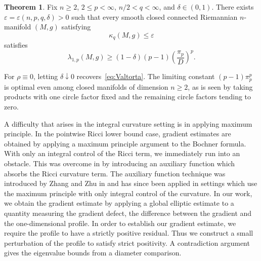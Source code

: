 \documentclass[11pt]{amsart}
\theoremstyle{definition}
\newtheorem{theorem}{Theorem}[section]
\newtheorem{lemma}[theorem]{Lemma}
\begin{document}
\begin{theorem}\label{thm:main}
Fix $n\ge2$, $2\le p<\infty$, $n/2<q<\infty$, and $\delta\in(0,1)$. There exists $\varepsilon=\varepsilon(n,p,q,\delta)>0$ such that every smooth closed connected Riemannian $n$-manifold $(M,g)$ satisfying
\[
 \kappa_q(M,g)\le\varepsilon
\]
satisfies
\begin{equation}\label{eq:main}
 \lambda_{1,p}(M,g)\ge(1-\delta)(p-1)
                  \left(\frac{\pi_p}{D}\right)^p.
\end{equation}
\end{theorem}
 For $\rho\equiv0$, letting $\delta\downarrow0$ recovers~\eqref{eq:Valtorta}. The limiting constant $(p-1)\pi_p^p$ is optimal even among closed manifolds of dimension $n\ge2$, as is seen by taking products with one circle factor fixed and the remaining circle factors tending to zero. 

A difficulty that arises in the integral curvature setting is in applying maximum principle.  In the pointwise Ricci lower bound case, gradient estimates are obtained by applying a maximum principle argument to the Bochner formula.  With only an integral control of the Ricci term, we immediately run into an obstacle.  This was overcome in \cite{RamosSetoWeiZhang2020} by introducing an auxiliary function which absorbs the Ricci curvature term.  The auxiliary function technique was introduced by Zhang and Zhu in \cite{ZhangZhu2017} and has since been applied in settings which use the maximum principle with only integral control of the curvature.   In our work, we obtain the gradient estimate by applying a global elliptic estimate to a quantity measuring the gradient defect, the difference between the gradient and the one-dimensional profile. In order to establish our gradient estimate, we require the profile to have a strictly positive residual.  Thus we construct a small perturbation of the profile to satisfy strict positivity. A contradiction argument gives the eigenvalue bounds from a diameter comparison.


\end{document}
